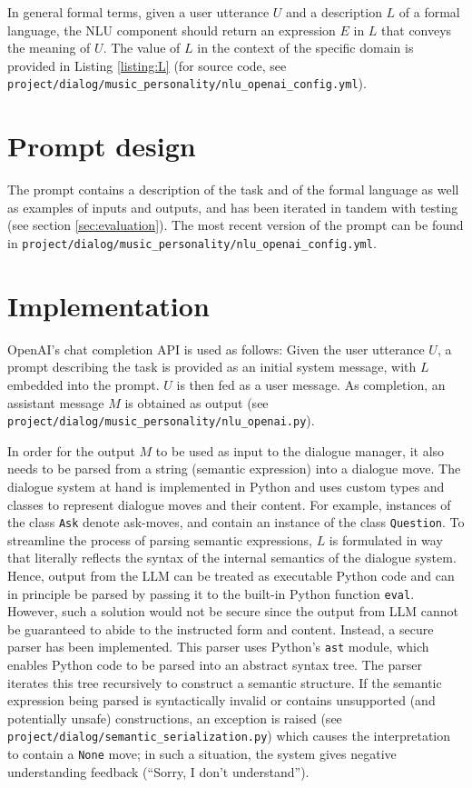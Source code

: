\documentclass[11pt]{article}
\begin{document}
In general formal terms, given a user utterance $U$ and a description $L$ of a formal language, the NLU component should return an expression $E$ in $L$ that conveys the meaning of $U$. The value of $L$ in the context of the specific domain is provided in Listing \ref{listing:L} (for source code, see \texttt{project/dialog/music\_personality/nlu\_openai\_config.yml}).



\section{Prompt design}
The prompt contains a description of the task and of the formal language as well as examples of inputs and outputs, and has been iterated in tandem with testing (see section \ref{sec:evaluation}). The most recent version of the prompt can be found in \texttt{project/dialog/music\_personality/nlu\_openai\_config.yml}.

\section{Implementation}
OpenAI's chat completion API is used as follows: Given the user utterance $U$, a prompt describing the task is provided as an initial system message, with $L$ embedded into the prompt. $U$ is then fed as a user message. As completion, an assistant message $M$ is obtained as output (see \texttt{project/dialog/music\_personality/nlu\_openai.py}). 

In order for the output $M$ to be used as input to the dialogue manager, it also needs to be parsed from a string (semantic expression) into a dialogue move. The dialogue system at hand is implemented in Python and uses custom types and classes to represent dialogue moves and their content. For example, instances of the class \texttt{Ask} denote ask-moves, and contain an instance of the class \texttt{Question}. To streamline the process of parsing semantic expressions, $L$ is formulated in way that literally reflects the syntax of the internal semantics of the dialogue system. Hence, output from the LLM can be treated as executable Python code and can in principle be parsed by passing it to the built-in Python function \texttt{eval}. However, such a solution would not be secure since the output from LLM cannot be guaranteed to abide to the instructed form and content. Instead, a secure parser has been implemented. This parser uses Python's \texttt{ast} module, which enables Python code to be parsed into an abstract syntax tree. The parser iterates this tree recursively to construct a semantic structure. If the semantic expression being parsed is syntactically invalid or contains unsupported (and potentially unsafe) constructions, an exception is raised (see \texttt{project/dialog/semantic\_serialization.py}) which causes the interpretation to contain a \texttt{None} move; in such a situation, the system gives negative understanding feedback (``Sorry, I don't understand'').
\end{document}
